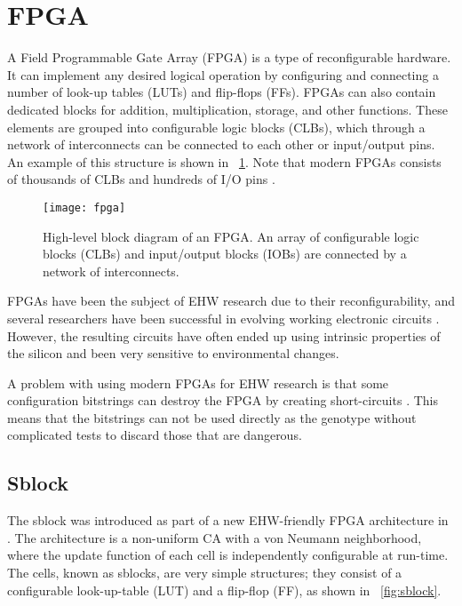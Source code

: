 
\section{FPGA}

A Field Programmable Gate Array (FPGA) is a type of reconfigurable hardware.
It can implement any desired logical operation by configuring and connecting a number of look-up tables (LUTs) and flip-flops (FFs).
FPGAs can also contain dedicated blocks for addition, multiplication, storage, and other functions.
These elements are grouped into configurable logic blocks (CLBs), which through a network of interconnects can be connected to each other or input/output pins.
An example of this structure is shown in \figurename~\ref{fig:fpga}.
Note that modern FPGAs consists of thousands of CLBs and hundreds of I/O pins \cite{ds160}.

\begin{figure}[!ht]
    \centering
    \texttt{[image: fpga]}
    \caption[FPGA]{
        High-level block diagram of an FPGA.
        An array of configurable logic blocks (CLBs) and input/output blocks (IOBs) are connected by a network of interconnects.
    }
    \label{fig:fpga}
\end{figure}

FPGAs have been the subject of EHW research due to their reconfigurability, and several researchers have been successful in evolving working electronic circuits \cite{huelsbergen1998evolution} \cite{thompson1997evolved}.
However, the resulting circuits have often ended up using intrinsic properties of the silicon and been very sensitive to environmental changes.

A problem with using modern FPGAs for EHW research is that some configuration bitstrings can destroy the FPGA by creating short-circuits \cite{ug380} \cite{xapp151}.
This means that the bitstrings can not be used directly as the genotype without complicated tests to discard those that are dangerous.

\subsection{Sblock}
\label{sec:sblock}

The sblock was introduced as part of a new EHW-friendly FPGA architecture in \cite{haddow2000sblock}.
The architecture is a non-uniform CA with a von Neumann neighborhood, where the update function of each cell is independently configurable at run-time.
The cells, known as sblocks, are very simple structures; they consist of a configurable look-up-table (LUT) and a flip-flop (FF), as shown in \figurename~\ref{fig:sblock}.


